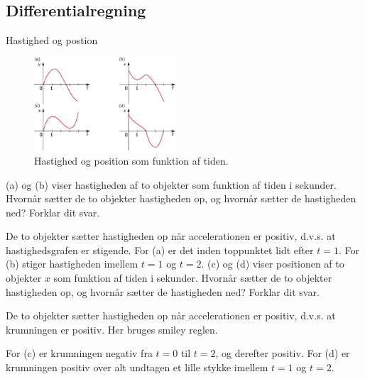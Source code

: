 \subsection*{Differentialregning}
\begin{opgave}{Hastighed og postion}
	\begin{figure}[]
		\centering
		\includegraphics[width=0.47\textwidth]{Matematik/matfig/vx_grafer.eps}
		\caption{Hastighed og position som funktion af tiden.}
		\label{fig:vx_grafer}
	\end{figure}
	\opg {} (a) og (b) viser hastigheden af to objekter som funktion af tiden i sekunder. Hvornår sætter de to objekter hastigheden op, og hvornår sætter de hastigheden ned? Forklar dit svar.
	
	De to objekter sætter hastigheden op når accelerationen er positiv, d.v.s. at hastighedsgrafen er stigende.
	For (a) er det inden toppunktet lidt efter $t=1$.
	For (b) stiger hastigheden imellem $t=1$ og $t=2$.
	\opg {} (c) og (d) viser positionen af to objekter $x$ som funktion af tiden i sekunder. Hvornår sætter de to objekter hastigheden op, og hvornår sætter de hastigheden ned? Forklar dit svar.
	
	De to objekter sætter hastigheden op når accelerationen er positiv, d.v.s. at krumningen er positiv. Her bruges smiley reglen.
	
	For (c) er krumningen negativ fra $t=0$ til $t=2$, og derefter positiv.
	For (d) er krumningen positiv over alt undtagen et lille stykke imellem $t=1$ og $t=2$.
\end{opgave}

